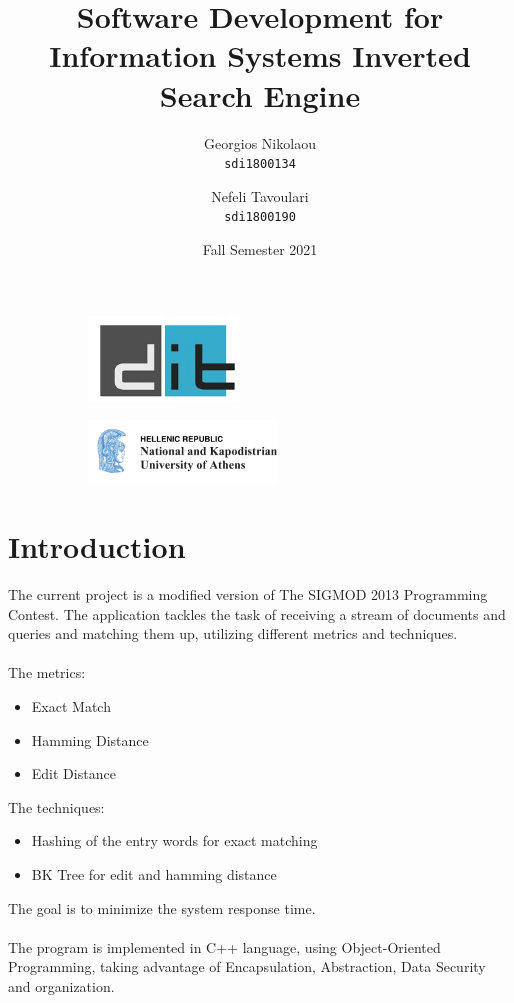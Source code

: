\documentclass{article}
\title{%
\HUGE
Software Development for Information Systems \LARGE Inverted Search Engine}
\begin{document}
\author{\Large
  Georgios Nikolaou\\
   \texttt{\large sdi1800134}
  \and
  \Large
  Nefeli Tavoulari\\
   \texttt{\large sdi1800190}
}
\date{Fall Semester 2021}
\maketitle
\begin{figure}
\centering
\begin{subfigure}
  \centering
  \includegraphics[width=40mm]{dit_logo}
  \label{fig:sub1}
\end{subfigure}%
\begin{subfigure}
  \centering
  \includegraphics[width=50mm]{NKUA_logo}
  \label{fig:sub2}
\end{subfigure}
\label{fig:test}
\end{figure}


\newpage
\tableofcontents
\newpage
\section{Introduction} \large
The current project is a modified version of The SIGMOD 2013 Programming Contest.
The application tackles the task of receiving a stream of documents and queries and matching them up, utilizing different metrics and techniques. \\ \\
The metrics:
\begin{itemize}
    \item Exact Match
    \item Hamming Distance
    \item Edit Distance
\end{itemize}
The techniques:
\begin{itemize}
    \item Hashing of the entry words for exact matching
    \item BK Tree for edit and hamming distance
\end{itemize}
The goal is to minimize the system response time. \\ \\
The program is implemented in C++ language, using Object-Oriented Programming, taking advantage of Encapsulation, Abstraction, Data Security and organization.
\newpage
\end{document}

